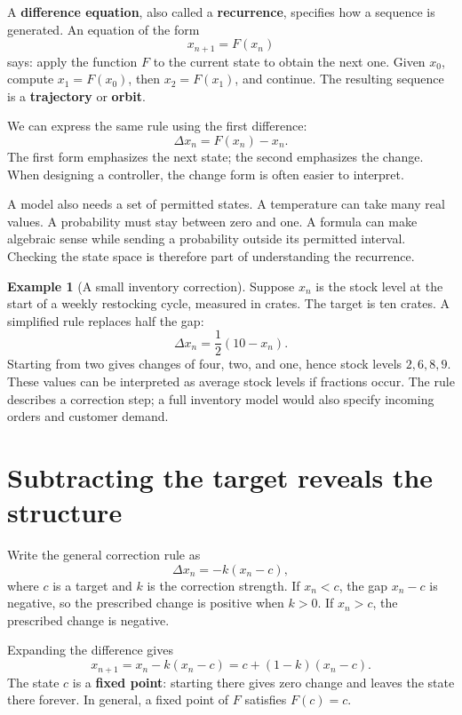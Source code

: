 \documentclass[11pt,oneside,openany]{book}
\theoremstyle{definition}
\newtheorem{example}{Example}[chapter]
\theoremstyle{remark}
\numberwithin{equation}{chapter}
\begin{document}
A \textbf{difference equation}, also called a \textbf{recurrence}, specifies how a sequence is generated. An equation of the form \[x_{n+1}=F(x_n)\] says: apply the function \(F\) to the current state to obtain the next one. Given \(x_0\), compute \(x_1=F(x_0)\), then \(x_2=F(x_1)\), and continue. The resulting sequence is a \textbf{trajectory} or \textbf{orbit}.

We can express the same rule using the first difference: \[\Delta x_n=F(x_n)-x_n.\] The first form emphasizes the next state; the second emphasizes the change. When designing a controller, the change form is often easier to interpret.

A model also needs a set of permitted states. A temperature can take many real values. A probability must stay between zero and one. A formula can make algebraic sense while sending a probability outside its permitted interval. Checking the state space is therefore part of understanding the recurrence.

\begin{example}[A small inventory correction]

Suppose \(x_n\) is the stock level at the start of a weekly restocking cycle, measured in crates. The target is ten crates. A simplified rule replaces half the gap: \[\Delta x_n=\frac12(10-x_n).\] Starting from two gives changes of four, two, and one, hence stock levels \(2,6,8,9\). These values can be interpreted as average stock levels if fractions occur. The rule describes a correction step; a full inventory model would also specify incoming orders and customer demand.

\end{example}

\section{Subtracting the target reveals the structure}\label{ch02-subtracting-the-target-reveals-the-structure}

Write the general correction rule as \[\Delta x_n=-k(x_n-c),\] where \(c\) is a target and \(k\) is the correction strength. If \(x_n<c\), the gap \(x_n-c\) is negative, so the prescribed change is positive when \(k>0\). If \(x_n>c\), the prescribed change is negative.

Expanding the difference gives \[x_{n+1}=x_n-k(x_n-c)=c+(1-k)(x_n-c).\] The state \(c\) is a \textbf{fixed point}: starting there gives zero change and leaves the state there forever. In general, a fixed point of \(F\) satisfies \(F(c)=c\).
\end{document}
